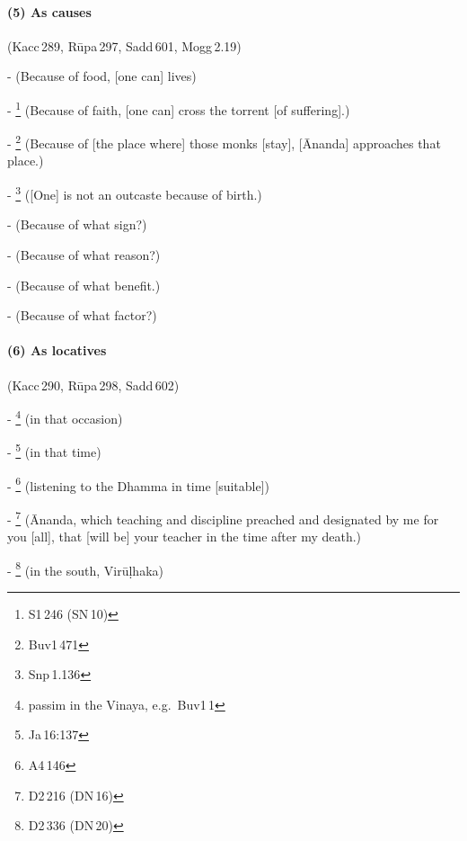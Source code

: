 \paragraph*{(5) As causes} (Kacc\,289, R\=upa\,297, Sadd\,601, Mogg\,2.19)\par
-  (Because of food, [one can] lives)\par
- \footnote{S1\,246 (SN\,10)} (Because of faith, [one can] cross the torrent [of suffering].)\par
- \footnote{Buv1\,471} (Because of [the place where] those monks [stay], [\=Ananda] approaches that place.)\par
- \footnote{Snp\,1.136} ([One] is not an outcaste because of birth.)\par
-  (Because of what sign?)\par
-  (Because of what reason?)\par
-  (Because of what benefit.)\par
-  (Because of what factor?)\par

\paragraph*{(6) As locatives} (Kacc\,290, R\=upa\,298, Sadd\,602)\par
- \footnote{passim in the Vinaya, e.g.\ Buv1\,1} (in that occasion)\par
- \footnote{Ja\,16:137} (in that time)\par
- \footnote{A4\,146} (listening to the Dhamma in time [suitable])\par
- \footnote{D2\,216 (DN\,16)} (\=Ananda, which teaching and discipline preached and designated by me for you [all], that [will be] your teacher in the time after my death.)\par
- \footnote{D2\,336 (DN\,20)} (in the south, Vir\=u\d lhaka)\par

